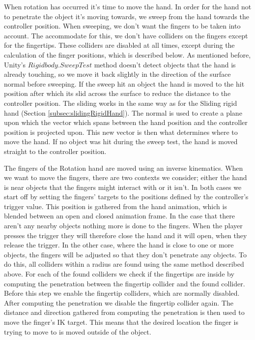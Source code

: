 When rotation has occurred it's time to move the hand. In order for the hand not to penetrate the object it's moving towards, we sweep from the hand towards the controller position. When sweeping, we don't want the fingers to be taken into account. The accommodate for this, we don't have colliders on the fingers except for the fingertips. These colliders are disabled at all times, except during the calculation of the finger positions, which is described below. As mentioned before, Unity's $Rigidbody.SweepTest$ method doesn't detect objects that the hand is already touching, so we move it back slightly in the direction of the surface normal before sweeping. If the sweep hit an object the hand is moved to the hit position after which its slid across the surface to reduce the distance to the controller position. The sliding works in the same way as for the Sliding rigid hand (Section \ref{subsec:slidingRigidHand}). The normal is used to create a plane upon which the vector which spans between the hand position and the controller position is projected upon. This new vector is then what determines where to move the hand. If no object was hit during the sweep test, the hand is moved straight to the controller position.

The fingers of the Rotation hand are moved using an inverse kinematics. When we want to move the fingers, there are two contexts we consider; either the hand is near objects that the fingers might interact with or it isn't. In both cases we start off by setting the fingers' targets to the positions defined by the controller's trigger value. This position is gathered from the hand animation, which is blended between an open and closed animation frame. In the case that there aren't any nearby objects nothing more is done to the fingers. When the player presses the trigger they will therefore close the hand and it will open, when they release the trigger. In the other case, where the hand is close to one or more objects, the fingers will be adjusted so that they don't penetrate any objects. To do this, all colliders within a radius are found using the same method described above. For each of the found colliders we check if the fingertips are inside by computing the penetration between the fingertip collider and the found collider. Before this step we enable the fingertip colliders, which are normally disabled. After computing the penetration we disable the fingertip collider again. The distance and direction gathered from computing the penetration is then used to move the finger's IK target. This means that the desired location the finger is trying to move to is moved outside of the object.

